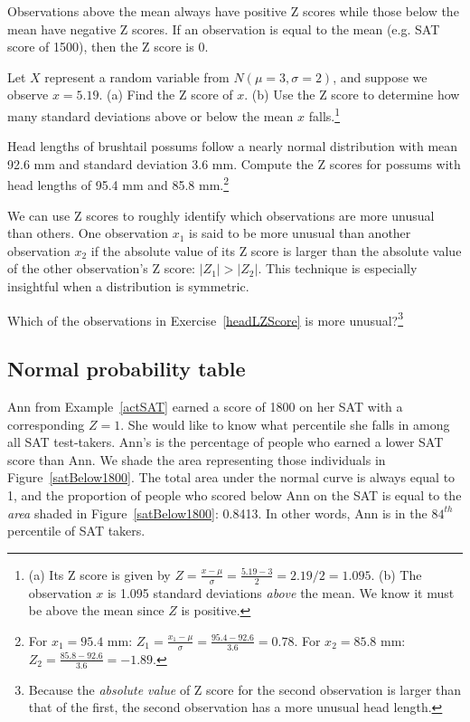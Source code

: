 Observations above the mean always have positive Z scores while those below the mean have negative Z scores. If an observation is equal to the mean (e.g. SAT score of 1500), then the Z score is $0$.

\begin{exercise}
Let $X$ represent a random variable from $N(\mu=3, \sigma=2)$, and suppose we observe $x=5.19$. (a) Find the Z score of $x$. (b) Use the Z score to determine how many standard deviations above or below the mean $x$ falls.\footnote{(a) Its Z score is given by $Z = \frac{x-\mu}{\sigma} = \frac{5.19 - 3}{2} = 2.19/2 = 1.095$. (b) The observation $x$ is 1.095 standard deviations \emph{above} the mean. We know it must be above the mean since $Z$ is positive.}
\end{exercise}

\begin{exercise} \label{headLZScore}
Head lengths of brushtail possums follow a nearly normal distribution with mean 92.6 mm and standard deviation 3.6 mm. Compute the Z scores for possums with head lengths of 95.4 mm and 85.8 mm.\footnote{For $x_1=95.4$ mm: $Z_1 = \frac{x_1 - \mu}{\sigma} = \frac{95.4 - 92.6}{3.6} = 0.78$. For $x_2=85.8$ mm: $Z_2 = \frac{85.8 - 92.6}{3.6} = -1.89$.}
\end{exercise}

We can use Z scores to roughly identify which observations are more unusual than others. One observation $x_1$ is said to be more unusual than another observation $x_2$ if the absolute value of its Z score is larger than the absolute value of the other observation's Z score: $|Z_1| > |Z_2|$. This technique is especially insightful when a distribution is symmetric.

\begin{exercise}
Which of the observations in Exercise~\ref{headLZScore} is more unusual?\footnote{Because the \emph{absolute value} of Z score for the second observation is larger than that of the first, the second observation has a more unusual head length.}
\end{exercise}


\subsection{Normal probability table}

\begin{example}{Ann from Example~\ref{actSAT} earned a score of 1800 on her SAT with a corresponding $Z=1$. She would like to know what percentile she falls in among all SAT test-takers.}
Ann's  is the percentage of people who earned a lower SAT score than Ann. We shade the area representing those individuals in Figure~\ref{satBelow1800}. The total area under the normal curve is always equal to 1, and the proportion of people who scored below Ann on the SAT is equal to the \emph{area} shaded in Figure~\ref{satBelow1800}: 0.8413. In other words, Ann is in the $84^{th}$ percentile of SAT takers.
\end{example}

